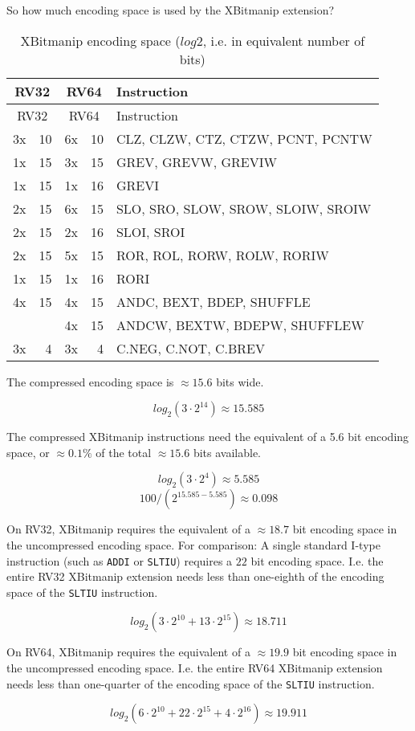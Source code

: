 So how much encoding space is used by the XBitmanip extension?

\begin{longtable}[c]{@{}rr|rr|l@{}}
\caption{XBitmanip encoding space ($log2$, i.e. in equivalent number of bits)}\tabularnewline
\toprule
\multicolumn{2}{c}{RV32} & \multicolumn{2}{c}{RV64} & Instruction\tabularnewline
\midrule
\endfirsthead
\toprule
\multicolumn{2}{c}{RV32} & \multicolumn{2}{c}{RV64} & Instruction\tabularnewline
\midrule
\endhead
3x & 10 & 6x & 10 & CLZ, CLZW, CTZ, CTZW, PCNT, PCNTW\tabularnewline
\midrule
1x & 15 & 3x & 15 & GREV, GREVW, GREVIW\tabularnewline
1x & 15 & 1x & 16 & GREVI\tabularnewline
\midrule
2x & 15 & 6x & 15 & SLO, SRO, SLOW, SROW, SLOIW, SROIW\tabularnewline
2x & 15 & 2x & 16 & SLOI, SROI\tabularnewline
\midrule
2x & 15 & 5x & 15 & ROR, ROL, RORW, ROLW, RORIW\tabularnewline
1x & 15 & 1x & 16 & RORI\tabularnewline
\midrule
4x & 15 & 4x & 15 & ANDC, BEXT, BDEP, SHUFFLE\tabularnewline
   &    & 4x & 15 & ANDCW, BEXTW, BDEPW, SHUFFLEW\tabularnewline
\midrule
3x &  4 & 3x &  4 & C.NEG, C.NOT, C.BREV\tabularnewline
\bottomrule
\end{longtable}

The compressed encoding space is $\approx 15.6$ bits wide.

$$ log_2(3 \cdot 2^{14}) \approx 15.585 $$

The compressed XBitmanip instructions need the equivalent of a 5.6 bit
encoding space, or $\approx 0.1\%$ of the total $\approx 15.6$ bits available.

$$ log_2(3 \cdot 2^4) \approx 5.585 $$
$$ 100 / (2^{15.585-5.585}) \approx 0.098 $$

On RV32, XBitmanip requires the equivalent of a $\approx 18.7$ bit encoding space in
the uncompressed encoding space. For comparison: A single standard I-type
instruction (such as \texttt{ADDI} or \texttt{SLTIU}) requires a $22$ bit
encoding space. I.e. the entire RV32 XBitmanip extension needs less than
one-eighth of the encoding space of the \texttt{SLTIU} instruction.

$$ log_2(3\cdot2^{10} + 13\cdot2^{15}) \approx 18.711 $$

On RV64, XBitmanip requires the equivalent of a $\approx 19.9$ bit encoding
space in the uncompressed encoding space. I.e. the entire RV64 XBitmanip
extension needs less than one-quarter of the encoding space of the
\texttt{SLTIU} instruction.

$$ log_2(6\cdot2^{10} + 22\cdot2^{15} + 4\cdot2^{16}) \approx 19.911 $$


